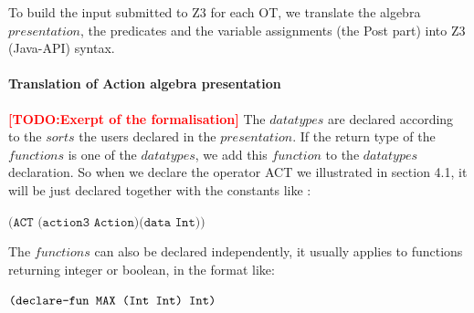 \documentclass{lncs/llncs}
\newcommand{\TODO}[1]{\textcolor{red}{\textbf{[TODO:#1]}}}
\newcommand{\OTvar}{\texttt}
\begin{document}

%

To build the input submitted to Z3 for each OT,
we translate the algebra $presentation$, the predicates and the
variable assignments (the Post part) into Z3 (Java-API) syntax.

\paragraph{Translation of Action algebra presentation}
\TODO{Exerpt of the formalisation}
The $datatypes$ are declared according to the $sorts$ the users
declared in the $presentation$. If the return type of the $functions$
is one of the $datatypes$, we add this $function$ to the $datatypes$ declaration.
So when we declare the operator ACT we illustrated in section 4.1, it
will be just declared together with the constants like :\\
\centerline{$\OTvar{(ACT\ (action3\ Action)(data\ Int))}$}

The $functions$ can also be declared independently, it usually applies to functions returning integer or boolean, in the format like:\\
\centerline{$\OTvar{(declare\text{-}fun\ MAX\ (Int\ Int)\ Int)}$}

%
%
%
\end{document}
